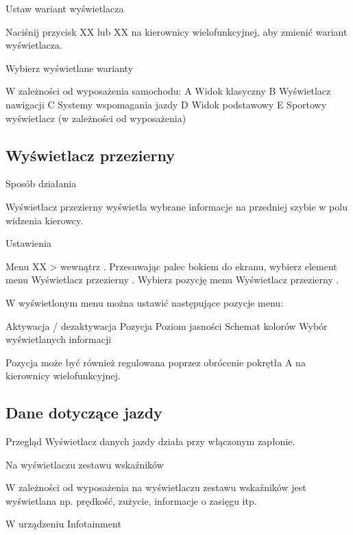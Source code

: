 Ustaw wariant wyświetlacza

\begin{itemizeArrow}
	\itemArrow Naciśnij przycisk XX lub XX na kierownicy wielofunkcyjnej, aby zmienić wariant wyświetlacza.
\end{itemizeArrow}

Wybierz wyświetlane warianty

W zależności od wyposażenia samochodu:
A Widok klasyczny
B Wyświetlacz nawigacji
C Systemy wspomagania jazdy
D Widok podstawowy
E Sportowy wyświetlacz (w zależności od wyposażenia)  %

\subsection{Wyświetlacz przezierny}

Sposób działania

Wyświetlacz przezierny wyświetla wybrane informacje na przedniej szybie w polu widzenia kierowcy.

Ustawienia

\begin{itemizeArrow}
	\itemArrow Menu XX > wewnątrz .
	\itemArrow Przesuwając palec bokiem do ekranu, wybierz element menu Wyświetlacz przezierny .
	\itemArrow Wybierz pozycję menu Wyświetlacz przezierny .
\end{itemizeArrow}
W wyświetlonym menu można ustawić następujące pozycje menu:
\begin{itemizeTriangle}
	\itemTriangle Aktywacja / dezaktywacja
	\itemTriangle Pozycja
	\itemTriangle Poziom jasności
	\itemTriangle Schemat kolorów
	\itemTriangle Wybór wyświetlanych informacji
\end{itemizeTriangle}

Pozycja może być również regulowana poprzez obrócenie pokrętła A na kierownicy wielofunkcyjnej.


\subsection{Dane dotyczące jazdy}

Przegląd
Wyświetlacz danych jazdy działa przy włączonym zapłonie.

Na wyświetlaczu zestawu wskaźników

W zależności od wyposażenia na wyświetlaczu zestawu wskaźników jest wyświetlana np. prędkość, zużycie, informacje o zasięgu itp.

W urządzeniu Infotainment

